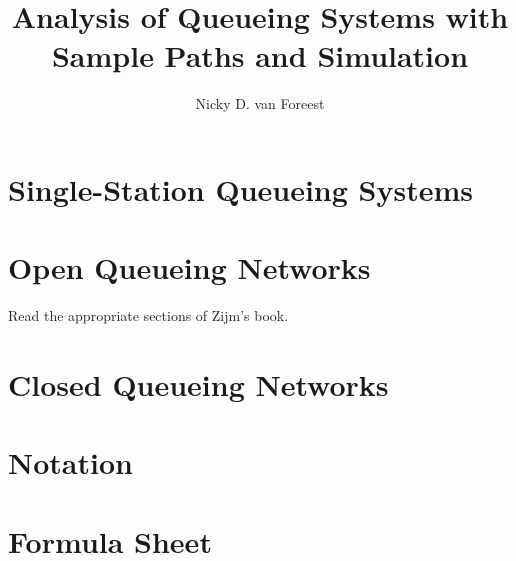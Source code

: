 \documentclass[a4paper,11pt]{scrbook}
\author{Nicky D. van  Foreest}
\title{Analysis of Queueing Systems with  Sample Paths and Simulation }
\begin{document}
\maketitle
\tableofcontents



\chapter{Single-Station Queueing Systems}
\label{cha:single-stat-queu}



















% 

 

 


\chapter{Open Queueing Networks}
\label{sec:notes-relat-chapt2}

Read the appropriate sections of Zijm's book. 








\chapter{Closed Queueing Networks}
\label{ch3}








\chapter{Notation}
\label{sec:notation}


\chapter{Formula Sheet}

   



\end{document}
